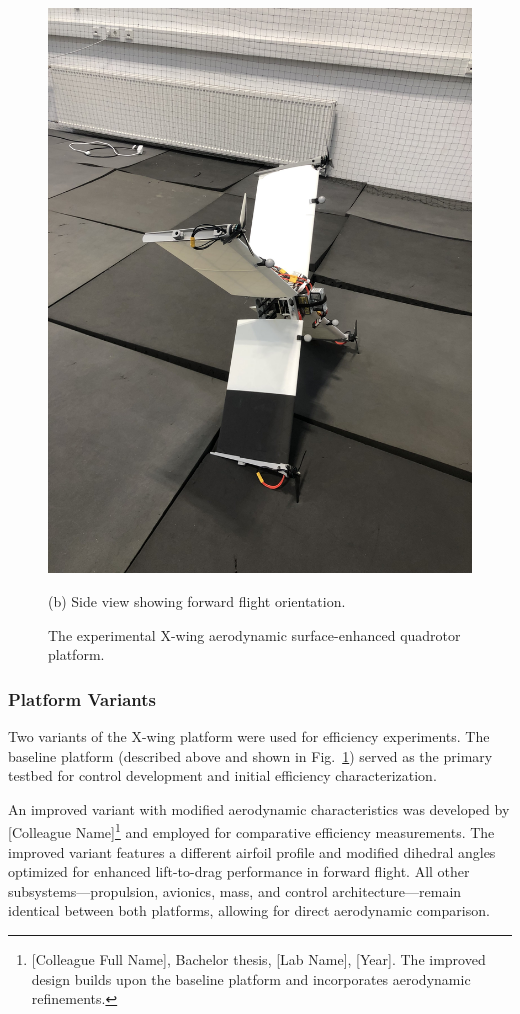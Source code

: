 \begin{figure}[htbp]
\begin{minipage}[b]{0.48\textwidth}
    \includegraphics[width=\textwidth,angle=-90]{figures/drone_wing_flight.jpg}
    \caption*{(b) Side view showing forward flight orientation.}
\end{minipage}
\caption{The experimental X-wing aerodynamic surface-enhanced quadrotor platform.}
\label{fig:xwing_platform}
\end{figure}

\subsubsection{Platform Variants}
Two variants of the X-wing platform were used for efficiency experiments. The baseline platform (described above and shown in Fig.~\ref{fig:xwing_platform}) served as the primary testbed for control development and initial efficiency characterization. 

An improved variant with modified aerodynamic characteristics was developed by [Colleague Name]\footnote{[Colleague Full Name], Bachelor thesis, [Lab Name], [Year]. The improved design builds upon the baseline platform and incorporates aerodynamic refinements.} and employed for comparative efficiency measurements. The improved variant features a different airfoil profile and modified dihedral angles optimized for enhanced lift-to-drag performance in forward flight. All other subsystems—propulsion, avionics, mass, and control architecture—remain identical between both platforms, allowing for direct aerodynamic comparison.


